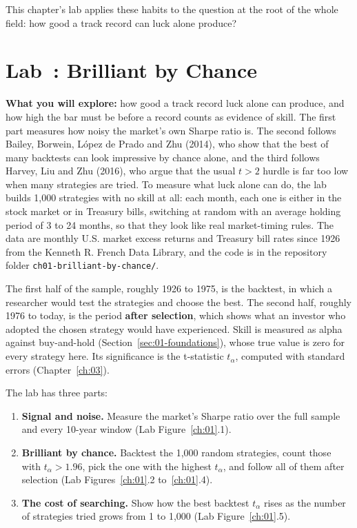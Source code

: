 This chapter's lab applies these habits to the question at the root of the whole field: how good a track record can luck alone produce?

\section{Lab~\thechapter: Brilliant by Chance}
\label{sec:01-lab}

\textbf{What you will explore:} how good a track record luck alone can produce, and how high the bar must be before a record counts as evidence of skill. The first part measures how noisy the market's own Sharpe ratio is. The second follows Bailey, Borwein, L\'opez de Prado and Zhu (2014), who show that the best of many backtests can look impressive by chance alone, and the third follows Harvey, Liu and Zhu (2016), who argue that the usual $t > 2$ hurdle is far too low when many strategies are tried. To measure what luck alone can do, the lab builds 1,000 strategies with no skill at all: each month, each one is either in the stock market or in Treasury bills, switching at random with an average holding period of 3 to 24 months, so that they look like real market-timing rules. The data are monthly U.S. market excess returns and Treasury bill rates since 1926 from the Kenneth R. French Data Library, and the code is in the repository folder \texttt{ch01-brilliant-by-chance/}.

The first half of the sample, roughly 1926 to 1975, is the backtest, in which a researcher would test the strategies and choose the best. The second half, roughly 1976 to today, is the period \textbf{after selection}, which shows what an investor who adopted the chosen strategy would have experienced. Skill is measured as alpha against buy-and-hold (Section~\ref{sec:01-foundations}), whose true value is zero for every strategy here. Its significance is the  t-statistic $t_\alpha$, computed with \label{kt:newey-west} standard errors (Chapter~\ref{ch:03}).

The lab has three parts:
\begin{enumerate}
  \item \textbf{Signal and noise.} Measure the market's Sharpe ratio over the full sample and every 10-year window (Lab Figure~\ref{ch:01}.1).
  \item \textbf{Brilliant by chance.} Backtest the 1,000 random strategies, count those with $t_\alpha > 1.96$, pick the one with the highest $t_\alpha$, and follow all of them after selection (Lab Figures~\ref{ch:01}.2 to~\ref{ch:01}.4).
  \item \textbf{The cost of searching.} Show how the best backtest $t_\alpha$ rises as the number of strategies tried grows from 1 to 1,000 (Lab Figure~\ref{ch:01}.5).
\end{enumerate}

